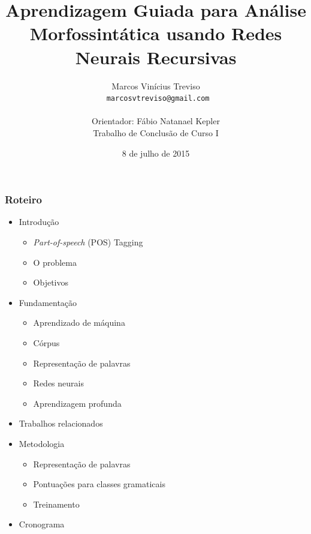 \documentclass[10pt]{beamer}
\title{Aprendizagem Guiada para Análise Morfossintática usando Redes Neurais Recursivas}
\subtitle{}
\date{8 de julho de 2015}
\author[Treviso]{Marcos Vinícius Treviso\\\scriptsize\texttt{ marcosvtreviso@gmail.com}\\\\Orientador: Fábio Natanael Kepler\\\tiny{Trabalho de Conclusão de Curso I}\\}
\institute{Universidade Federal do Pampa}
\begin{document}
\maketitle


\begin{frame}
  \frametitle{Roteiro}


  \begin{itemize}

  \vspace{-1em}

    \item Introdução
    
    \begin{itemize}
      \item[\ ] \textit{Part-of-speech} (POS) Tagging 
      \item[\ ] O problema
      \item[\ ] Objetivos
    \end{itemize}


    \item Fundamentação

    \begin{itemize}
      \item[\ ] Aprendizado de máquina
      \item[\ ] Córpus
      \item[\ ] Representação de palavras
      \item[\ ] Redes neurais
      \item[\ ] Aprendizagem profunda
    \end{itemize}


    \item Trabalhos relacionados

    \item Metodologia

    \begin{itemize}
      \item[\ ] Representação de palavras
      \item[\ ] Pontuações para classes gramaticais
      \item[\ ] Treinamento
    \end{itemize}


    \item Cronograma

  \end{itemize}

\end{frame}
\end{document}
